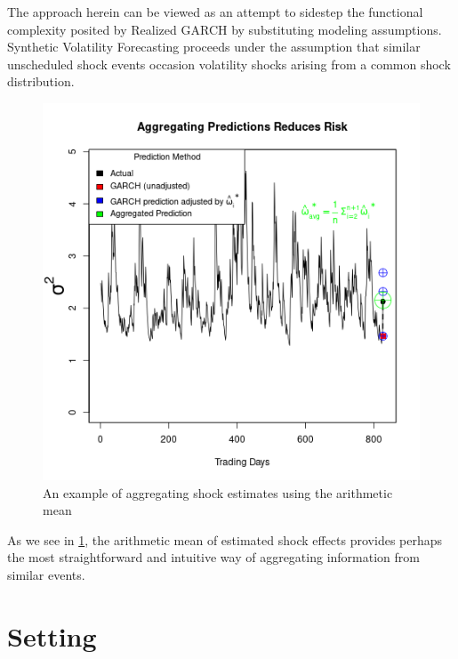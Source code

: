 \documentclass[11pt]{article}
\theoremstyle{definition}
\begin{document}
The approach herein can be viewed as an attempt to sidestep the functional complexity posited by Realized GARCH by substituting modeling assumptions.  Synthetic Volatility Forecasting proceeds under the assumption that similar unscheduled shock events occasion volatility shocks arising from a common shock distribution.

\begin{figure}[h]
\begin{center}
  \includegraphics[scale=.5]{simulation_plots/USE_in_paper_simulation_plot_arithmetic_mean.png}
  \caption{An example of aggregating shock estimates using the arithmetic mean}
  \label{fig:arith_mean}
  \end{center}
\end{figure}

As we see in \ref{fig:arith_mean}, the arithmetic mean of estimated shock effects provides perhaps the most straightforward and intuitive way of aggregating information from similar events.


\section{Setting}
\label{section2}
\end{document}
